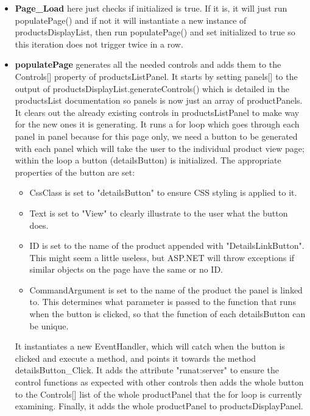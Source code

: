 ﻿\documentclass{article}
\begin{document}
    \begin{itemize}
        \item \textbf{Page\_Load} here just checks if initialized is true.
        If it is, it will just run populatePage() and if not it will instantiate a new instance of productsDisplayList, then run populatePage() and set initialized to true so this iteration does not trigger twice in a row.
        \item \textbf{populatePage} generates all the needed controls and adds them to the Controls[] property of productsListPanel.
        It starts by setting panels[] to the output of productsDisplayList.generateControls() which is detailed in the productsList documentation so panels is now just an array of productPanels.
        It clears out the already existing controls in productsListPanel to make way for the new ones it is generating.
        It runs a for loop which goes through each panel in panel because for this page only, we need a button to be generated with each panel which will take the user to the individual product view page; within the loop a button (detailsButton) is initialized.
        The appropriate properties of the button are set:
        \begin{itemize}
            \item CssClass is set to "detailsButton" to ensure CSS styling is applied to it.
            \item Text is set to "View" to clearly illustrate to the user what the button does.
            \item ID is set to the name of the product appended with "DetailsLinkButton".
            This might seem a little useless, but ASP.NET will throw exceptions if similar objects on the page have the same or no ID.
            \item CommandArgument is set to the name of the product the panel is linked to.
            This determines what parameter is passed to the function that runs when the button is clicked, so that the function of each detailsButton can be unique.
        \end{itemize}
        It instantiates a new EventHandler, which will catch when the button is clicked and execute a method, and points it towards the method detailsButton\_Click.
        It adds the attribute "runat:server" to ensure the control functions as expected with other controls then adds the whole button to the Controls[] list of the whole productPanel that the for loop is currently examining.
        Finally, it adds the whole productPanel to productsDisplayPanel.

\end{itemize}
\end{document}
